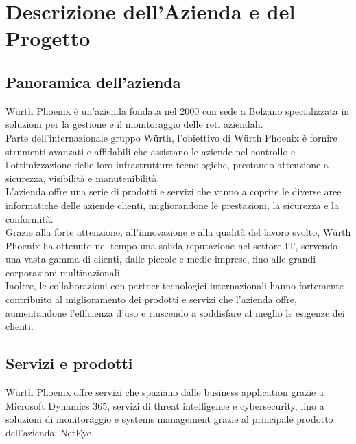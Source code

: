 \chapter{Descrizione dell'Azienda e del Progetto}
\label{cha:azienda_progetto}

\section{Panoramica dell'azienda}
\label{sec:panoramica} Würth Phoenix è un'azienda fondata nel 2000 con sede a
Bolzano specializzata in soluzioni per la gestione e il monitoraggio delle reti
aziendali.\\ Parte dell'internazionale gruppo Würth, l'obiettivo di Würth Phoenix
è fornire strumenti avanzati e affidabili che assistano le aziende nel controllo
e l'ottimizzazione delle loro infrastrutture tecnologiche, prestando attenzione
a sicurezza, visibilità e manutenibilità.\\ L'azienda offre una serie di prodotti
e servizi che vanno a coprire le diverse aree informatiche delle aziende clienti,
migliorandone le prestazioni, la sicurezza e la conformità.\\ Grazie alla forte attenzione,
all'innovazione e alla qualità del lavoro svolto, Würth Phoenix ha ottenuto nel tempo
una solida reputazione nel settore IT, servendo una vasta gamma di clienti, dalle
piccole e medie imprese, fino alle grandi corporazioni multinazionali.\\ Inoltre,
le collaborazioni con partner tecnologici internazionali hanno fortemente contribuito
al miglioramento dei prodotti e servizi che l'azienda offre, aumentandone l'efficienza
d'uso e riuscendo a soddisfare al meglio le esigenze dei clienti.

\section{Servizi e prodotti}
\label{sec:servizi_prodotti} Würth Phoenix offre servizi che spaziano dalle
business application grazie a Microsoft Dynamics 365, servizi di threat intelligence
e cybersecurity, fino a soluzioni di monitoraggio e systems management grazie al
principale prodotto dell'azienda: NetEye.

